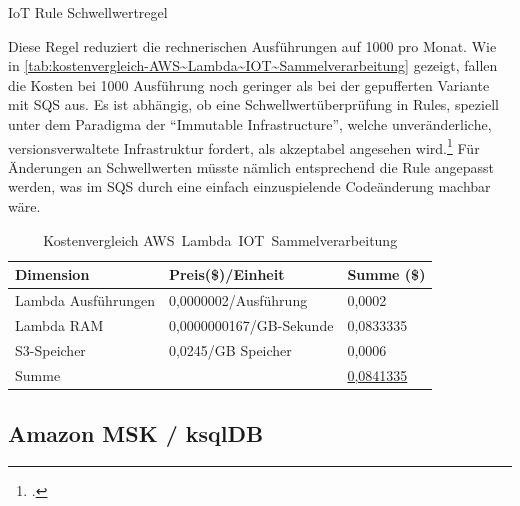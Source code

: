 \begin{listing}[H]
\inputminted[frame=lines,breaklines=true]{sql}{code/iot-rules-lambda-filter.sql}
\caption{IoT Rule Schwellwertregel}
\label{listing:iot-rule-threshold}
\end{listing}
Diese Regel reduziert die rechnerischen Ausführungen auf 1000 pro Monat. Wie in \autoref{tab:kostenvergleich-AWS~Lambda~IOT~Sammelverarbeitung} gezeigt, fallen die Kosten bei 1000 Ausführung noch geringer als bei der gepufferten Variante mit \ac{SQS} aus. Es ist abhängig, ob eine Schwellwertüberprüfung in \AWSIOT{} Rules, speziell unter dem Paradigma der \enquote{Immutable Infrastructure}, welche unveränderliche, versionsverwaltete Infrastruktur fordert, als akzeptabel angesehen wird.\footcite[Vgl.][]{AmazonWebServicesInc..o.J.p} Für Änderungen an Schwellwerten müsste nämlich entsprechend die \AWSIOT{} Rule angepasst werden, was im \ac{SQS} durch eine einfach einzuspielende Codeänderung machbar wäre.

\begin{table}[H]
\centering
\begin{tabular}{|l|l|l|}
\hline
Dimension & Preis(\$)/Einheit & Summe (\$) \\ \hline
Lambda Ausführungen & 0,0000002/Ausführung & 0,0002 \\ \hline
Lambda \ac{RAM} & 0,0000000167/GB-Sekunde & 0,0833335 \\ \hline
\ac{S3}-Speicher & 0,0245/GB Speicher & 0,0006 \\ \hline
Summe & \cellcolor[HTML]{EFEFEF} & \underline{0,0841335} \\ \hline
\end{tabular}
\caption{Kostenvergleich AWS~Lambda~IOT~Sammelverarbeitung}
\label{tab:kostenvergleich-AWS~Lambda~IOT~Sammelverarbeitung}
\end{table}


\subsection{Amazon MSK / ksqlDB}


